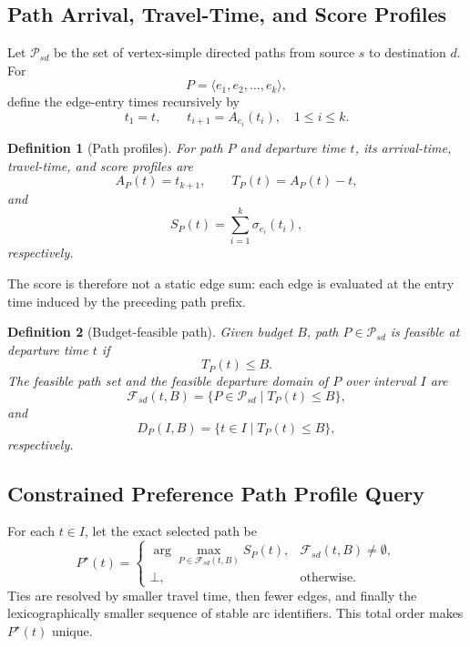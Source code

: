 \documentclass[a4paper,fleqn]{cas-dc}
\newtheorem{definition}{Definition}
\begin{document}
\subsection{Path Arrival, Travel-Time, and Score Profiles}
\label{subsec:path_profiles}

Let \(\mathcal P_{sd}\) be the set of vertex-simple directed paths from source \(s\) to destination \(d\). For
\[
P=\langle e_1,e_2,\ldots,e_k\rangle,
\]
define the edge-entry times recursively by
\[
t_1=t,
\qquad
t_{i+1}=A_{e_i}(t_i),
\quad 1\leq i\leq k.
\]

\begin{definition}[Path profiles]
For path \(P\) and departure time \(t\), its arrival-time, travel-time, and score profiles are
\[
A_P(t)=t_{k+1},
\qquad
T_P(t)=A_P(t)-t,
\]
and
\[
S_P(t)=\sum_{i=1}^{k}\sigma_{e_i}(t_i),
\]
respectively.
\end{definition}

The score is therefore not a static edge sum: each edge is evaluated at the entry time induced by the preceding path prefix.

\begin{definition}[Budget-feasible path]
Given budget \(B\), path \(P\in\mathcal P_{sd}\) is feasible at departure time \(t\) if
\[
T_P(t)\leq B.
\]
The feasible path set and the feasible departure domain of \(P\) over interval \(I\) are
\[
\mathcal F_{sd}(t,B)
=
\{P\in\mathcal P_{sd}\mid T_P(t)\leq B\},
\]
and
\[
D_P(I,B)
=
\{t\in I\mid T_P(t)\leq B\},
\]
respectively.
\end{definition}

\subsection{Constrained Preference Path Profile Query}
\label{subsec:profile_query}

For each \(t\in I\), let the exact selected path be
\[
P^\star(t)
=
\begin{cases}
\displaystyle
\arg\max_{P\in\mathcal F_{sd}(t,B)} S_P(t),
& \mathcal F_{sd}(t,B)\neq\emptyset,\\[1.2ex]
\bot,
& \text{otherwise.}
\end{cases}
\]
Ties are resolved by smaller travel time, then fewer edges, and finally the lexicographically smaller sequence of stable arc identifiers. This total order makes \(P^\star(t)\) unique.
\end{document}
